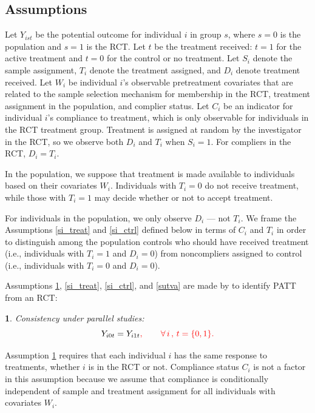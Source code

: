 \documentclass[hidelinks,12pt]{article}
\makeatletter
\newtheorem*{assumption*}{\assumptionnumber}
\providecommand{\assumptionnumber}{}
\newenvironment{assumption}[2]
 {%
  \renewcommand{\assumptionnumber}{Assumption #1}%
  \begin{assumption*}%
  \protected@edef\@currentlabel{#1}%
 }
 {%
  \end{assumption*}
 }
\makeatother
\begin{document}
\subsection{Assumptions} \label{assumptions}
Let $Y_{ist}$ be the potential outcome for individual $i$ in group $s$, where $s=0$ is the population and $s=1$ is the RCT. Let $t$ be the treatment received: $t=1$ for the active treatment and $t=0$ for the control or no treatment. Let $S_i$ denote the sample assignment, $T_i$ denote the treatment assigned, and $D_i$ denote treatment received. Let $W_i$ be individual $i$'s observable pretreatment covariates that are related to the sample selection mechanism for membership in the RCT, treatment assignment in the population, and complier status. Let $C_i$ be an indicator for individual $i$'s compliance to treatment{\color{red}, which is only observable for individuals in the RCT treatment group}. Treatment is assigned at random by the investigator in the RCT, so we observe both $D_i$ and $T_i$ when $S_i = 1$. For compliers in the RCT, $D_i = T_i$.

In the population, we suppose that treatment is made available to individuals based on their covariates $W_i$. Individuals with $T_i = 0$ do not receive treatment, while those with $T_i=1$ may decide whether or not to accept treatment. {\color{red}For individuals in the population, we only observe $D_i$ --- not $T_i$. We frame the Assumptions \ref{si_treat} and \ref{si_ctrl} defined below in terms of $C_i$ and $T_i$ in order to distinguish among the population controls who should have received treatment (i.e., individuals with $T_i = 1$ and $D_i = 0$) from noncompliers assigned to control (i.e., individuals with $T_i = 0$ and $D_i = 0$). 

Assumptions \ref{consistency}, \ref{si_treat}, \ref{si_ctrl}, and \ref{sutva} are made by \citet{Hartman} to identify PATT from an RCT:
}

\vskip 0.2in
\begin{assumption}{1}{}\label{consistency}
	Consistency under parallel studies:
	\begin{equation*}
	Y_{i0t} = Y_{i1t}{\color{red}, \qquad \forall \, i \, , \, t=\{0,1\}.}
	\end{equation*}
\end{assumption} 

\noindent Assumption \ref{consistency} requires that each individual $i$ has the same response to treatments, whether $i$ is in the RCT or not. {\color{red} Compliance status $C_i$ is not a factor in this assumption because we assume that compliance is conditionally independent of sample and treatment assignment for all individuals with covariates $W_i$.}
	
\end{document}
